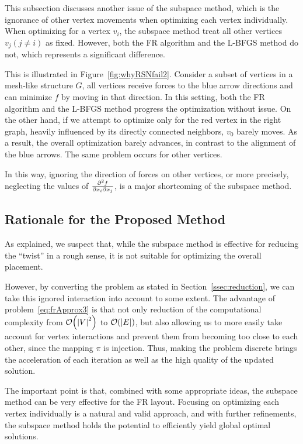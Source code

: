 \documentclass[dvipdfmx,journal]{IEEEtran}
\begin{document}
This subsection discusses another issue of the subspace method, which is the ignorance of other vertex movements when optimizing each vertex individually.
When optimizing for a vertex $v_i$, the subspace method treat all other vertices $v_j (j \neq i)$ as fixed. However, both the FR algorithm and the L-BFGS method do not, which represents a significant difference.

This is illustrated in Figure~\ref{fig:whyRSNfail2}.
Consider a subset of vertices in a mesh-like structure $G$, all vertices receive forces to the blue arrow directions and can minimize $f$ by moving in that direction.
In this setting, both the FR algorithm and the L-BFGS method progress the optimization without issue.
On the other hand, if we attempt to optimize only for the red vertex in the right graph, heavily influenced by its directly connected neighbors, $v_0$ barely moves.
As a result, the overall optimization barely advances, in contrast to the alignment of the blue arrows.
The same problem occurs for other vertices.

In this way, ignoring the direction of forces on other vertices, or more precisely, neglecting the values of $\pdv{f}{x_i}{x_j}$, is a major shortcoming of the subspace method.

\subsection{Rationale for the Proposed Method}\label{ssec:rationale}

As explained, we suspect that, while the subspace method is effective for reducing the ``twist'' in a rough sense, it is not suitable for optimizing the overall placement.

However, by converting the problem as stated in Section~\ref{ssec:reduction}, we can take this ignored interaction into account to some extent.
The advantage of problem~\eqref{eq:frApprox3} is that not only reduction of the computational complexity from $\order{\abs{V}^2}$ to $\order{\abs{E}}$, but also allowing us to more easily take account for vertex interactions and prevent them from becoming too close to each other, since the mapping $\pi$ is injection.
Thus, making the problem discrete brings the acceleration of each iteration as well as the high quality of the updated solution.

The important point is that, combined with some appropriate ideas, the subspace method can be very effective for the FR layout.
Focusing on optimizing each vertex individually is a natural and valid approach, and with further refinements, the subspace method holds the potential to efficiently yield global optimal solutions.
\end{document}

